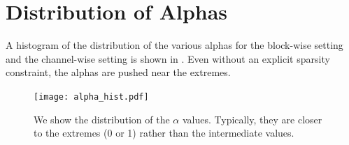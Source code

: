 

\section{Distribution of Alphas}
A histogram of the distribution of the various alphas for the block-wise setting and the channel-wise setting is shown in . Even without an explicit sparsity constraint, the alphas are pushed near the extremes. 
\begin{figure}[t]
    \centering
    \texttt{[image: alpha\_hist.pdf]}
    \caption{We show the distribution of the $\alpha$ values. Typically, they are closer to the extremes (0 or 1) rather than the intermediate values.}
    \label{fig:alpha_hist}
\end{figure}



% 
% 

